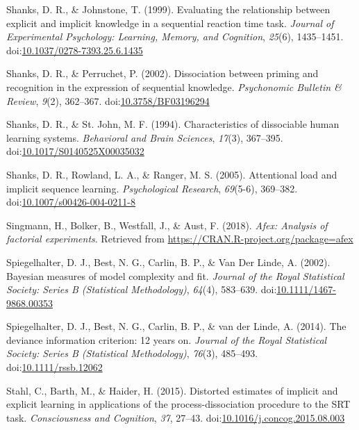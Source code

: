 \documentclass[man]{apa6}
\theoremstyle{definition}
\theoremstyle{definition}
\theoremstyle{definition}
\theoremstyle{remark}
\begin{document}
\hypertarget{ref-shanks_evaluating_1999}{}
Shanks, D. R., \& Johnstone, T. (1999). Evaluating the relationship
between explicit and implicit knowledge in a sequential reaction time
task. \emph{Journal of Experimental Psychology: Learning, Memory, and
Cognition}, \emph{25}(6), 1435--1451.
doi:\href{https://doi.org/10.1037/0278-7393.25.6.1435}{10.1037/0278-7393.25.6.1435}

\hypertarget{ref-shanks_dissociation_2002}{}
Shanks, D. R., \& Perruchet, P. (2002). Dissociation between priming and
recognition in the expression of sequential knowledge. \emph{Psychonomic
Bulletin \& Review}, \emph{9}(2), 362--367.
doi:\href{https://doi.org/10.3758/BF03196294}{10.3758/BF03196294}

\hypertarget{ref-shanks_characteristics_1994}{}
Shanks, D. R., \& St. John, M. F. (1994). Characteristics of dissociable
human learning systems. \emph{Behavioral and Brain Sciences},
\emph{17}(3), 367--395.
doi:\href{https://doi.org/10.1017/S0140525X00035032}{10.1017/S0140525X00035032}

\hypertarget{ref-shanks_attentional_2005}{}
Shanks, D. R., Rowland, L. A., \& Ranger, M. S. (2005). Attentional load
and implicit sequence learning. \emph{Psychological Research},
\emph{69}(5-6), 369--382.
doi:\href{https://doi.org/10.1007/s00426-004-0211-8}{10.1007/s00426-004-0211-8}

\hypertarget{ref-R-afex}{}
Singmann, H., Bolker, B., Westfall, J., \& Aust, F. (2018). \emph{Afex:
Analysis of factorial experiments}. Retrieved from
\url{https://CRAN.R-project.org/package=afex}

\hypertarget{ref-spiegelhalter_bayesian_2002}{}
Spiegelhalter, D. J., Best, N. G., Carlin, B. P., \& Van Der Linde, A.
(2002). Bayesian measures of model complexity and fit. \emph{Journal of
the Royal Statistical Society: Series B (Statistical Methodology)},
\emph{64}(4), 583--639.
doi:\href{https://doi.org/10.1111/1467-9868.00353}{10.1111/1467-9868.00353}

\hypertarget{ref-spiegelhalter_deviance_2014}{}
Spiegelhalter, D. J., Best, N. G., Carlin, B. P., \& van der Linde, A.
(2014). The deviance information criterion: 12 years on. \emph{Journal
of the Royal Statistical Society: Series B (Statistical Methodology)},
\emph{76}(3), 485--493.
doi:\href{https://doi.org/10.1111/rssb.12062}{10.1111/rssb.12062}

\hypertarget{ref-stahl_distorted_2015}{}
Stahl, C., Barth, M., \& Haider, H. (2015). Distorted estimates of
implicit and explicit learning in applications of the
process-dissociation procedure to the SRT task. \emph{Consciousness and
Cognition}, \emph{37}, 27--43.
doi:\href{https://doi.org/10.1016/j.concog.2015.08.003}{10.1016/j.concog.2015.08.003}
\end{document}
